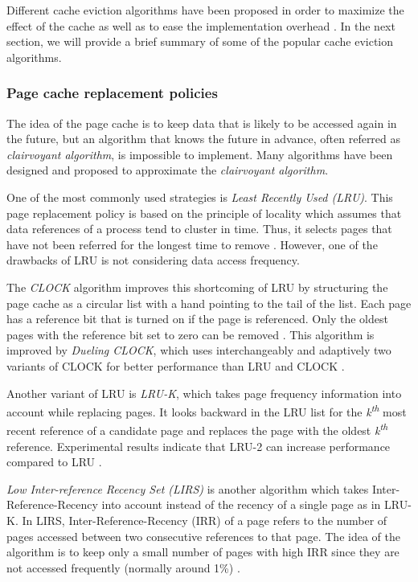 Different cache eviction algorithms have been 
proposed in order to maximize the effect of the cache as well as to 
ease the implementation overhead \cite{chavan2011comparison}.
In the next section, we will provide a brief summary of some of the popular 
cache eviction algorithms.

\subsubsection{Page cache replacement policies}

The idea of the page cache is to keep data that is likely to be accessed again 
in the future, but an algorithm that knows the future in advance, often 
referred as \textit{clairvoyant algorithm}, is impossible to implement. 
Many algorithms have been designed and proposed to approximate the 
\textit{clairvoyant algorithm}. 

One of the most commonly used strategies is \textit{Least Recently Used (LRU)}. 
This page replacement policy is based on the principle of locality which assumes    
that data references of a process tend to cluster in time. 
Thus, it selects pages that have not been referred for the longest time to remove 
\cite{chavan2011comparison}. However, one of the drawbacks of LRU 
is not considering data access frequency.

The \textit{CLOCK} algorithm improves this shortcoming of LRU by 
structuring the page cache as a circular list with a hand pointing to 
the tail of the list.
Each page has a reference bit that is turned on if the page is referenced. 
Only the oldest pages with the reference bit set to zero can be removed 
\cite{chavan2011comparison}. 
This algorithm is improved by \textit{Dueling CLOCK}, which uses 
interchangeably and adaptively two variants of CLOCK for better 
performance than LRU and CLOCK \cite{chavan2011comparison}.

Another variant of LRU is \textit{LRU-K}, which takes page frequency 
information  into account while replacing pages. It looks backward in the 
LRU list for the \textit{k\textsuperscript{th}} most recent reference of 
a candidate page and replaces the page with the oldest 
\textit{k\textsuperscript{th}} reference. 
Experimental results indicate that LRU-2 can increase performance 
compared to LRU \cite{chavan2011comparison}. 

\textit{Low Inter-reference Recency Set (LIRS)} is another algorithm 
which takes Inter-Reference-Recency into account instead of the recency 
of a single page as in LRU-K. 
In LIRS, Inter-Reference-Recency (IRR) of a page refers to the 
number of pages accessed between two consecutive references to that page. 
The idea of the algorithm is to keep only a small number of pages with 
high IRR since they are not accessed frequently (normally around 1\%) 
\cite{chavan2011comparison}. 


